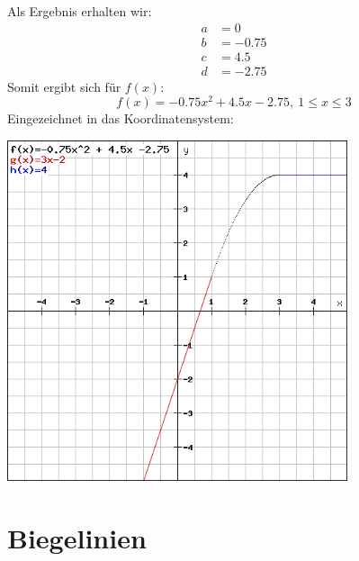 \documentclass[a4paper,12pt]{article}
\begin{document}
Als Ergebnis erhalten wir:
\begin{equation*}
\begin{split}
a & = 0\\
b & = -0.75\\
c & = 4.5\\
d & = -2.75
\end{split}
\end{equation*}
Somit ergibt sich für $f(x)$:
$$f(x) = -0.75x^2 + 4.5x - 2.75,\ 1 \leq x \leq 3$$
Eingezeichnet in das Koordinatensystem:
\begin{center}
\includegraphics[width=0.75\textwidth]{image2.png}
\end{center}
\pagebreak
\section{Biegelinien}
\end{document}
